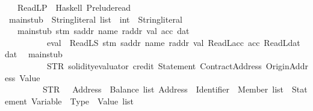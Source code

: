 \begin{isabellebody}
\ {\isacharbar}{\kern0pt}\ \ ReadL\isactrlsub P\ {\isasymrightharpoonup}\ {\isacharparenleft}{\kern0pt}Haskell{\isacharparenright}{\kern0pt}\ {\isachardoublequoteopen}Prelude{\isachardot}{\kern0pt}read{\isachardoublequoteclose}\isanewline
\isanewline
{}\isamarkupfalse%
\ main{\isacharunderscore}{\kern0pt}stub\ {\isacharcolon}{\kern0pt}{\isacharcolon}{\kern0pt}\ {\isachardoublequoteopen}String{\isachardot}{\kern0pt}literal\ list\ {\isasymRightarrow}\ {\isacharparenleft}{\kern0pt}int\ {\isasymtimes}\ String{\isachardot}{\kern0pt}literal{\isacharparenright}{\kern0pt}{\isachardoublequoteclose}\isanewline
\ \ \isanewline
\ \ \ {\isachardoublequoteopen}main{\isacharunderscore}{\kern0pt}stub\ {\isacharbrackleft}{\kern0pt}stm{\isacharcomma}{\kern0pt}\ saddr{\isacharcomma}{\kern0pt}\ name{\isacharcomma}{\kern0pt}\ raddr{\isacharcomma}{\kern0pt}\ val{\isacharcomma}{\kern0pt}\ acc{\isacharcomma}{\kern0pt}\ dat{\isacharbrackright}{\kern0pt}\isanewline
\ \ \ \ \ \ \ \ {\isacharequal}{\kern0pt}\ {\isacharparenleft}{\kern0pt}{}{\isacharcomma}{\kern0pt}\ eval{}\ {}{}{}{}\ {\isacharparenleft}{\kern0pt}ReadL\isactrlsub S\ stm{\isacharparenright}{\kern0pt}\ saddr\ name\ raddr\ val\ {\isacharparenleft}{\kern0pt}ReadL\isactrlsub a\isactrlsub c\isactrlsub c\ acc{\isacharparenright}{\kern0pt}\ {\isacharparenleft}{\kern0pt}ReadL\isactrlsub d\isactrlsub a\isactrlsub t\ dat{\isacharparenright}{\kern0pt}{\isacharparenright}{\kern0pt}{\isachardoublequoteclose}\isanewline
\ {\isacharbar}{\kern0pt}\ {\isachardoublequoteopen}main{\isacharunderscore}{\kern0pt}stub\ {\isacharunderscore}{\kern0pt}\ {\isacharequal}{\kern0pt}\ {\isacharparenleft}{\kern0pt}{}{\isacharcomma}{\kern0pt}\ \isanewline
\ \ \ \ \ \ \ \ \ \ STR\ {\isacharprime}{\kern0pt}{\isacharprime}{\kern0pt}solidity{\isacharminus}{\kern0pt}evaluator\ {\isacharbrackleft}{\kern0pt}credit{\isacharbrackright}{\kern0pt}\ {\isachardoublequote}{\kern0pt}Statement{\isachardoublequote}{\kern0pt}\ {\isachardoublequote}{\kern0pt}ContractAddress{\isachardoublequote}{\kern0pt}\ {\isachardoublequote}{\kern0pt}OriginAddress{\isachardoublequote}{\kern0pt}\ {\isachardoublequote}{\kern0pt}Value{\isachardoublequote}{\kern0pt}{\isasymnewline}{\isacharprime}{\kern0pt}{\isacharprime}{\kern0pt}\isanewline
\ \ \ \ \ \ \ \ {\isacharplus}{\kern0pt}\ STR\ {\isacharprime}{\kern0pt}{\isacharprime}{\kern0pt}\ \ {\isachardoublequote}{\kern0pt}{\isacharparenleft}{\kern0pt}Address\ {\isacharasterisk}{\kern0pt}\ Balance{\isacharparenright}{\kern0pt}\ list{\isachardoublequote}{\kern0pt}\ {\isachardoublequote}{\kern0pt}{\isacharparenleft}{\kern0pt}Address\ {\isacharasterisk}{\kern0pt}\ {\isacharparenleft}{\kern0pt}{\isacharparenleft}{\kern0pt}Identifier\ {\isacharasterisk}{\kern0pt}\ Member{\isacharparenright}{\kern0pt}\ list{\isacharparenright}{\kern0pt}\ {\isacharasterisk}{\kern0pt}\ Statement{\isacharparenright}{\kern0pt}{\isachardoublequote}{\kern0pt}\ {\isachardoublequote}{\kern0pt}{\isacharparenleft}{\kern0pt}Variable\ {\isacharasterisk}{\kern0pt}\ Type\ {\isacharasterisk}{\kern0pt}\ Value{\isacharparenright}{\kern0pt}\ list{\isachardoublequote}{\kern0pt}{\isasymnewline}{\isacharprime}{\kern0pt}{\isacharprime}{\kern0pt}\isanewline

\end{isabellebody}
